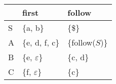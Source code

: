\documentclass{standalone}
\providecommand\lightrule{%
	\arrayrulecolor{black!30}%
	\midrule[\lightrulewidth]%
	\arrayrulecolor{black}}
\begin{document}
\begin{tabularx}{\textwidth}{XXX}
    & first & follow\\
    \midrule
        S
        &
        \{a, b\} %
        &
        \{\$\} %
        \\ \lightrule
        A
        &
        \{e, d, f, c\} %
        &
        \{follow(\(S\))\} %
        \\ \lightrule
        B
        &
        \{e, \(\varepsilon\)\} %
        &
        \{c, d\} %
        \\ \lightrule
        C
        &
        \{f, \(\varepsilon\)\} %
        &
        \{c\} %
\end{tabularx}
\end{document}
